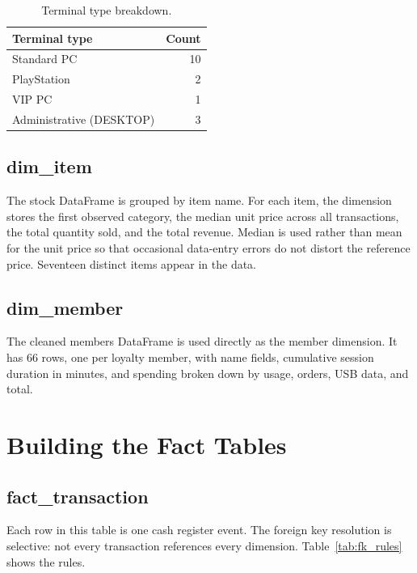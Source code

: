 \documentclass[12pt, a4paper]{report}
\begin{document}
\begin{table}[H]
  \centering
  \caption{Terminal type breakdown.\label{tab:terminals}}
  \begin{tabular}{lr}
    \toprule
    \textbf{Terminal type} & \textbf{Count} \\
    \midrule
    Standard PC & 10 \\
    PlayStation & 2 \\
    VIP PC      & 1 \\
    Administrative (DESKTOP) & 3 \\
    \bottomrule
  \end{tabular}
\end{table}

\subsection{dim\_item}

The stock DataFrame is grouped by item name. For each item, the dimension stores
the first observed category, the median unit price across all transactions, the total
quantity sold, and the total revenue. Median is used rather than mean for the unit
price so that occasional data-entry errors do not distort the reference price.
Seventeen distinct items appear in the data.

\subsection{dim\_member}

The cleaned members DataFrame is used directly as the member dimension. It has 66
rows, one per loyalty member, with name fields, cumulative session duration in
minutes, and spending broken down by usage, orders, USB data, and total.

\section{Building the Fact Tables}

\subsection{fact\_transaction}

Each row in this table is one cash register event. The foreign key resolution is
selective: not every transaction references every dimension. Table~\ref{tab:fk_rules}
shows the rules.
\end{document}
